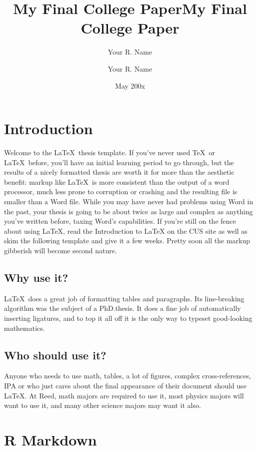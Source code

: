 \documentclass[12pt,twoside]{reedthesis}
\title{My Final College Paper}
\author{Your R. Name}
\date{May 200x}
\author{
Your R. Name\\
}
\title{My Final College Paper}
\begin{document}
\maketitle

%

\tableofcontents

\chapter*{Introduction}

Welcome to the \LaTeX~thesis template. If you've never used \TeX~or
\LaTeX~before, you'll have an initial learning period to go through, but
the results of a nicely formatted thesis are worth it for more than the
aesthetic benefit: markup like \LaTeX~is more consistent than the output
of a word processor, much less prone to corruption or crashing and the
resulting file is smaller than a Word file. While you may have never had
problems using Word in the past, your thesis is going to be about twice
as large and complex as anything you've written before, taxing Word's
capabilities. If you're still on the fence about using \LaTeX, read the
Introduction to LaTeX on the CUS site as well as skim the following
template and give it a few weeks. Pretty soon all the markup gibberish
will become second nature.

\section{Why use it?}

\LaTeX~does a great job of formatting tables and paragraphs. Its
line-breaking algorithm was the subject of a PhD.\thinspace thesis. It
does a fine job of automatically inserting ligatures, and to top it all
off it is the only way to typeset good-looking mathematics.

\section{Who should use it?}

Anyone who needs to use math, tables, a lot of figures, complex
cross-references, IPA or who just cares about the final appearance of
their document should use \LaTeX. At Reed, math majors are required to
use it, most physics majors will want to use it, and many other science
majors may want it also.

\chapter{R Markdown}
\end{document}
